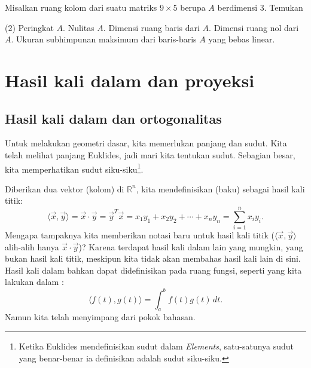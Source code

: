 \begin{exercise}
Misalkan ruang kolom dari suatu matriks $9 \times 5$ berupa $A$ berdimensi 3. Temukan
\begin{tasks}(2)
\task
Peringkat $A$.
\task
Nulitas $A$.
\task
Dimensi ruang baris dari $A$.
\task
Dimensi ruang nol dari $A$.
\task
Ukuran subhimpunan maksimum dari
baris-baris $A$ yang bebas linear.
\end{tasks}
\end{exercise}


\sectionnewpage
\section{Hasil kali dalam dan proyeksi}
\label{innerproduct:section}



\subsection{Hasil kali dalam dan ortogonalitas}

Untuk melakukan geometri dasar, kita memerlukan panjang dan sudut.
Kita telah melihat panjang Euklides, jadi mari kita tentukan sudut.
Sebagian besar, kita memperhatikan
sudut siku-siku\footnote{Ketika Euklides mendefinisikan sudut dalam
\emph{Elements}, satu-satunya sudut yang benar-benar ia definisikan adalah sudut siku-siku.}.

Diberikan dua vektor (kolom) di ${\mathbb{R}}^n$,
kita mendefinisikan
\emph{} (baku) sebagai
hasil kali titik:
\begin{equation*}
\langle \vec{x} , \vec{y} \rangle =
\vec{x} \cdot \vec{y}
=
\vec{y}^T \vec{x}
=
x_1 y_1 + x_2 y_2 + \cdots + x_n y_n
=
\sum_{i=1}^n x_i y_i .
\end{equation*}
Mengapa tampaknya kita memberikan notasi baru untuk hasil kali titik
($\langle \vec{x} , \vec{y} \rangle$ alih-alih hanya
$\vec{x} \cdot \vec{y}$)?
Karena terdapat hasil kali dalam lain yang mungkin, yang bukan hasil kali
titik, meskipun kita tidak akan membahas hasil kali lain di sini.
Hasil kali dalam bahkan dapat didefinisikan pada ruang fungsi,
seperti yang kita lakukan dalam
:
\begin{equation*}
\langle f(t) , g(t) \rangle =
\int_{a}^{b}
f(t) g(t) \, dt .
\end{equation*}
Namun kita telah menyimpang dari pokok bahasan.

